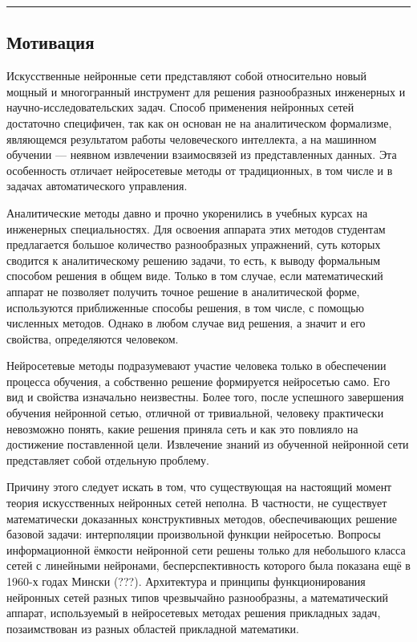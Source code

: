 


\hrule

\subsection{Мотивация}


Искусственные нейронные сети представляют собой относительно новый
мощный и многогранный инструмент для решения разнообразных инженерных
и научно-исследовательских задач.  Способ применения нейронных сетей
достаточно специфичен, так как он основан не на аналитическом
формализме, являющемся результатом работы человеческого интеллекта, а
на машинном обучении --- неявном извлечении взаимосвязей из
представленных данных.  Эта особенность отличает нейросетевые методы
от традиционных, в том числе и в задачах автоматического управления.

Аналитические методы давно и прочно укоренились в учебных курсах на
инженерных специальностях.  Для освоения аппарата этих методов
студентам предлагается большое количество разнообразных упражнений,
суть которых сводится к аналитическому решению задачи, то есть, к
выводу формальным способом решения в общем виде.  Только в том случае,
если математический аппарат не позволяет получить точное решение в
аналитической форме, используются приближенные способы решения, в том
числе, с помощью численных методов.  Однако в любом случае вид
решения, а значит и его свойства, определяются человеком.

Нейросетевые методы подразумевают участие человека только в
обеспечении процесса обучения, а собственно решение формируется
нейросетью само.  Его вид и свойства изначально неизвестны.  Более
того, после успешного завершения обучения нейронной сетью, отличной от
тривиальной, человеку практически невозможно понять, какие решения
приняла сеть и как это повлияло на достижение поставленной цели.
Извлечение знаний из обученной нейронной сети представляет собой
отдельную проблему.

Причину этого следует искать в том, что существующая на настоящий
момент теория искусственных нейронных сетей неполна.  В частности, не
существует математически доказанных конструктивных методов,
обеспечивающих решение базовой задачи: интерполяции произвольной
функции нейросетью.  Вопросы информационной ёмкости нейронной сети
решены только для небольшого класса сетей с линейными нейронами,
бесперспективность которого была показана ещё в 1960-х годах Мински
(???).  Архитектура и принципы функционирования нейронных сетей разных
типов чрезвычайно разнообразны, а математический аппарат, используемый
в нейросетевых методах решения прикладных задач, позаимствован из
разных областей прикладной математики.

